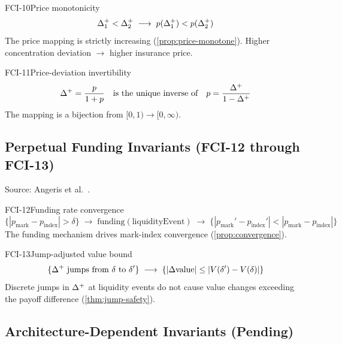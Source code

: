 \begin{invariant}{FCI-10}{Price monotonicity}
\[
  \Delta^{+}_1 < \Delta^{+}_2
  \;\longrightarrow\;
  p(\Delta^{+}_1) < p(\Delta^{+}_2)
\]
The price mapping is strictly increasing (\cref{prop:price-monotone}).
Higher concentration deviation $\to$ higher insurance price.
\end{invariant}

\begin{invariant}{FCI-11}{Price-deviation invertibility}
\[
  \Delta^{+} = \frac{p}{1 + p}
  \quad\text{is the unique inverse of}\quad
  p = \frac{\Delta^{+}}{1 - \Delta^{+}}
\]
The mapping is a bijection from $[0,1) \to [0,\infty)$.
\end{invariant}

\subsection{Perpetual Funding Invariants (FCI-12 through FCI-13)}

Source: Angeris et al.\ \cite{angeris2022perpetuals}.

\begin{invariant}{FCI-12}{Funding rate convergence}
\[
  \{|p_{\text{mark}} - p_{\text{index}}| > \delta\}
  \;\longrightarrow\; \text{funding}(\text{liquidityEvent})
  \;\longrightarrow\; \{|p_{\text{mark}}' - p_{\text{index}}'| < |p_{\text{mark}} - p_{\text{index}}|\}
\]
The funding mechanism drives mark-index convergence (\cref{prop:convergence}).
\end{invariant}

\begin{invariant}{FCI-13}{Jump-adjusted value bound}
\[
  \{\Delta^{+} \text{ jumps from } \delta \text{ to } \delta'\}
  \;\longrightarrow\;
  \{|\Delta\text{value}| \leq |V(\delta') - V(\delta)|\}
\]
Discrete jumps in $\Delta^{+}$ at liquidity events do not cause value changes
exceeding the payoff difference (\cref{thm:jump-safety}).
\end{invariant}

\subsection{Architecture-Dependent Invariants (Pending)}

